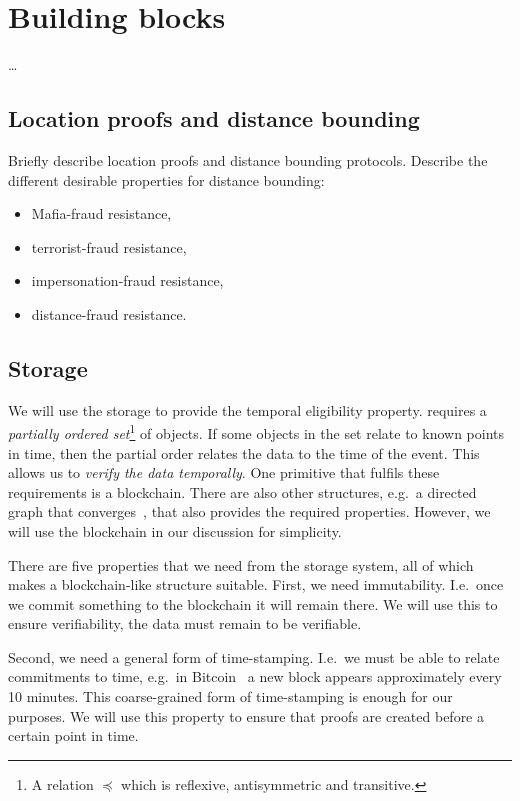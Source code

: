 \section{Building blocks}%
\label{Primitives}\label{BuildingBlocks}

\dots




\subsection{Location proofs and distance bounding}

Briefly describe location proofs and distance bounding protocols.
Describe the different desirable properties for distance bounding:
\begin{itemize}
  \item Mafia-fraud resistance,
  \item terrorist-fraud resistance,
  \item impersonation-fraud resistance,
  \item distance-fraud resistance.
\end{itemize}

\subsection{Storage}%
\label{StorageProperties}

We will use the storage to provide the temporal eligibility property.
 requires a \emph{partially ordered 
  set}\footnote{%
  A relation \(\preceq\) which is reflexive, antisymmetric and transitive.
} of objects.
If some objects in the set relate to known points in time, then the partial 
order relates the data to the time of the event.
This allows us to \emph{verify the data temporally}.
One primitive that fulfils these requirements is a blockchain.
There are also other structures, e.g.\ a directed graph that 
converges~\cite{BlockchainFreeCryptocurrencies}, that also provides the required 
properties.
However, we will use the blockchain in our discussion for simplicity.

There are five properties that we need from the storage system, all of which 
makes a blockchain-like structure suitable.
First, we need immutability.
I.e.\ once we commit something to the blockchain it will remain there.
We will use this to ensure verifiability, the data must remain to be verifiable.

Second, we need a general form of time-stamping.
I.e.\ we must be able to relate commitments to time, e.g.\ in 
Bitcoin~\cite{Bitcoin} a new block appears approximately every 10 minutes.
This coarse-grained form of time-stamping is enough for our purposes.
We will use this property to ensure that proofs are created before a certain 
point in time.

